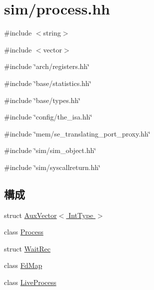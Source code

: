 \hypertarget{sim_2process_8hh}{
\section{sim/process.hh}
\label{sim_2process_8hh}
}
{\ttfamily \#include $<$string$>$}\par
{\ttfamily \#include $<$vector$>$}\par
{\ttfamily \#include \char`\"{}arch/registers.hh\char`\"{}}\par
{\ttfamily \#include \char`\"{}base/statistics.hh\char`\"{}}\par
{\ttfamily \#include \char`\"{}base/types.hh\char`\"{}}\par
{\ttfamily \#include \char`\"{}config/the\_\-isa.hh\char`\"{}}\par
{\ttfamily \#include \char`\"{}mem/se\_\-translating\_\-port\_\-proxy.hh\char`\"{}}\par
{\ttfamily \#include \char`\"{}sim/sim\_\-object.hh\char`\"{}}\par
{\ttfamily \#include \char`\"{}sim/syscallreturn.hh\char`\"{}}\par
\subsection*{構成}
\begin{DoxyCompactItemize}
\item 
struct \hyperlink{structAuxVector}{AuxVector$<$ IntType $>$}
\item 
class \hyperlink{classProcess}{Process}
\item 
struct \hyperlink{structProcess_1_1WaitRec}{WaitRec}
\item 
class \hyperlink{classProcess_1_1FdMap}{FdMap}
\item 
class \hyperlink{classLiveProcess}{LiveProcess}
\end{DoxyCompactItemize}

